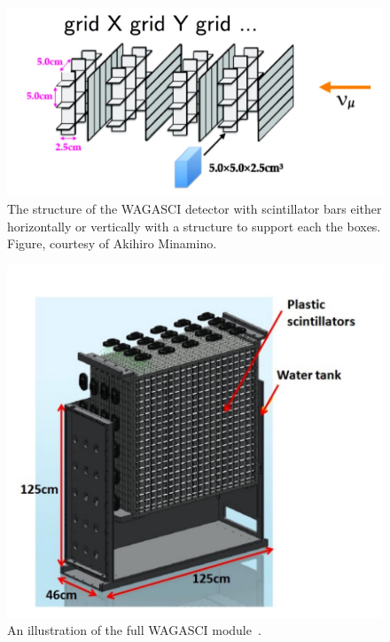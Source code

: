 
\begin{figure}[h!]
\centering
\includegraphics[width=\textwidth]{figures/structure2.jpeg}
\caption{The structure of the WAGASCI detector with scintillator bars either horizontally or vertically with a structure to support each the boxes. Figure, courtesy of Akihiro Minamino.}
\label{fig:StrucWAGASCI}
\end{figure}

\begin{figure}[h!]
\centering
\includegraphics[width=\textwidth]{figures/NeutrinoChap/NuFactTalk/WAGASCIm2.jpeg}
\caption{An illustration of the full WAGASCI module~\cite{114BabyMINDTDR}.}
\label{fig:WAGASCImod}
\end{figure}

